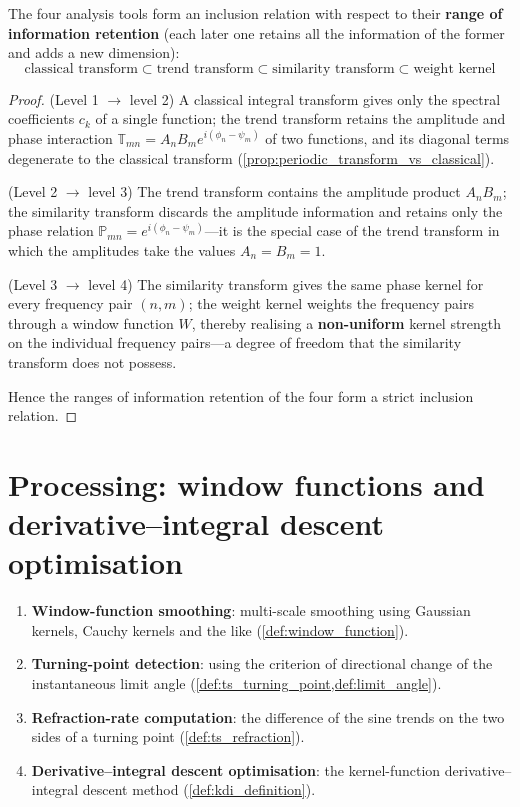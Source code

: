 \begin{proposition}\label{prop:analysis_hierarchy}
The four analysis tools form an inclusion relation with respect to their \textbf{range of information retention} (each later one retains all the information of the former and adds a new dimension):
\[
\text{classical transform} \subset \text{trend transform} \subset \text{similarity transform} \subset \text{weight kernel}
\]
\end{proposition}

\begin{proof}
(Level 1 $\to$ level 2) A classical integral transform gives only the spectral coefficients $c_k$ of a single function; the trend transform retains the amplitude and phase interaction $\mathbb{T}_{mn} = A_n B_m e^{i(\phi_n - \psi_m)}$ of two functions, and its diagonal terms degenerate to the classical transform (\cref{prop:periodic_transform_vs_classical}).

(Level 2 $\to$ level 3) The trend transform contains the amplitude product $A_n B_m$; the similarity transform discards the amplitude information and retains only the phase relation $\mathbb{P}_{mn} = e^{i(\phi_n - \psi_m)}$---it is the special case of the trend transform in which the amplitudes take the values $A_n = B_m = 1$.

(Level 3 $\to$ level 4) The similarity transform gives the same phase kernel for every frequency pair $(n,m)$; the weight kernel weights the frequency pairs through a window function $W$, thereby realising a \textbf{non-uniform} kernel strength on the individual frequency pairs---a degree of freedom that the similarity transform does not possess.

Hence the ranges of information retention of the four form a strict inclusion relation.
\end{proof}

\section{Processing: window functions and derivative--integral descent optimisation}

\begin{definition}\label{def:processing_tools}
\begin{enumerate}[label=(\roman*)]
    \item \textbf{Window-function smoothing}: multi-scale smoothing using Gaussian kernels, Cauchy kernels and the like (\cref{def:window_function}).
    \item \textbf{Turning-point detection}: using the criterion of directional change of the instantaneous limit angle (\cref{def:ts_turning_point,def:limit_angle}).
    \item \textbf{Refraction-rate computation}: the difference of the sine trends on the two sides of a turning point (\cref{def:ts_refraction}).
    \item \textbf{Derivative--integral descent optimisation}: the kernel-function derivative--integral descent method (\cref{def:kdi_definition}).
\end{enumerate}
\end{definition}

